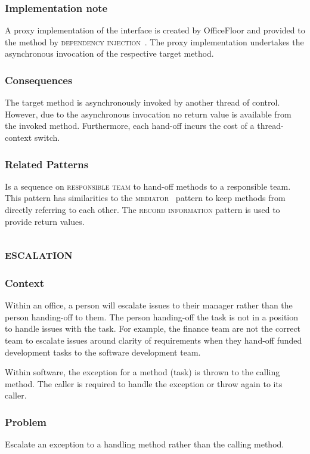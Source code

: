 \documentclass[prodmode]{style/acmlarge}
\begin{document}
\subsubsection*{Implementation note} A proxy implementation of the interface is
created by OfficeFloor and provided to the method by \textsc{dependency
injection}~\cite{ioc}.  The proxy implementation undertakes the asynchronous
invocation of the respective target method.

\subsubsection*{Consequences} The target method is asynchronously invoked by
another thread of control.  However, due to the asynchronous invocation no
return value is available from the invoked method.  Furthermore, each hand-off
incurs the cost of a thread-context switch.

\subsubsection*{Related Patterns} Is a sequence on \textsc{responsible team} to
hand-off methods to a responsible team.  This pattern has similarities to the
\textsc{mediator}~\cite{gof} pattern to keep methods from directly referring to
each other.  The \textsc{record information} pattern is used to provide return
values.



\subsection{\textsc{\textbf{escalation}}}

\subsubsection*{Context} Within an office, a person will escalate issues to
their manager rather than the person handing-off to them.  The person
handing-off the task is not in a position to handle issues with the task.  For
example, the finance team are not the correct team to escalate issues around
clarity of requirements when they hand-off funded development tasks to the
software development team.

Within software, the exception for a method (task) is thrown to the calling
method.  The caller is required to handle the exception or throw again to its
caller.

\subsubsection*{\textbf{Problem}} Escalate an exception to a handling method rather than
the calling method.
\end{document}
